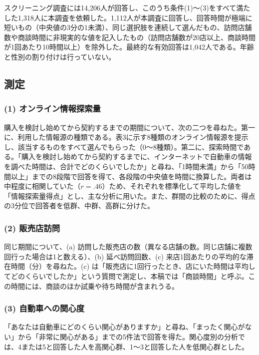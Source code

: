 スクリーニング調査には14,206人が回答し、このうち条件(1)〜(3)をすべて満たした1,318人に本調査を依頼した。1,112人が本調査に回答し、回答時間が極端に短いもの（中央値の3分の1未満）、同じ選択肢を連続して選んだもの、訪問店舗数や商談時間に非現実的な値を記入したもの（訪問店舗数が20店以上、商談時間が1回あたり10時間以上）を除外した。最終的な有効回答は1,042人である。年齢と性別の割り付けは行っていない。

\subsection{測定}

\subsubsection*{(1) オンライン情報探索量}

購入を検討し始めてから契約するまでの期間について、次の二つを尋ねた。第一に、利用した情報源の種類である。表3に示す8種類のオンライン情報源を提示し、該当するものをすべて選んでもらった（0〜8種類）。第二に、探索時間である。「購入を検討し始めてから契約するまでに、インターネットで自動車の情報を調べた時間は、合計でどのくらいでしたか」と尋ね、「1時間未満」から「50時間以上」までの8段階で回答を得て、各段階の中央値を時間に換算した。両者は中程度に相関していた（$r = .46$）ため、それぞれを標準化して平均した値を「情報探索量得点」とし、主な分析に用いた。また、群間の比較のために、得点の3分位で回答者を低群、中群、高群に分けた。

\subsubsection*{(2) 販売店訪問}

同じ期間について、(a) 訪問した販売店の数（異なる店舗の数。同じ店舗に複数回行った場合は1と数える）、(b) 延べ訪問回数、(c) 来店1回あたりの平均的な滞在時間（分）を尋ねた。(c) は「販売店に1回行ったとき、店にいた時間は平均してどのくらいでしたか」という質問で測定し、本稿では「商談時間」と呼ぶ。この時間には、商談のほか試乗や待ち時間が含まれうる。

\subsubsection*{(3) 自動車への関心度}

「あなたは自動車にどのくらい関心がありますか」と尋ね、「まったく関心がない」から「非常に関心がある」までの5件法で回答を得た。関心度別の分析では、4または5と回答した人を高関心群、1〜3と回答した人を低関心群とした。

